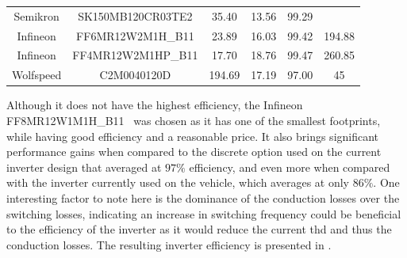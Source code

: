 \begin{table}[]
{\begin{tabular}{cccccc}
		Semikron              & SK150MB120CR03TE2          & 35.40         & 13.56  & 99.29      &                \\
		Infineon              & FF6MR12W2M1H\_B11          & 23.89         & 16.03  & 99.42      & 194.88         \\
		Infineon              & FF4MR12W2M1HP\_B11         & 17.70         & 18.76  & 99.47      & 260.85         \\ \midrule
		Wolfspeed             & C2M0040120D                & 194.69        & 17.19  & 97.00      & 45             \\ \bottomrule
	\end{tabular}
	}
\end{table}

Although it does not have the highest efficiency, the Infineon FF8MR12W1M1H\_B11~\cite{Infineon:Module_Datasheet:2023} was chosen as it has one of the smallest footprints, while having good efficiency and a reasonable price.  It also brings significant performance gains when compared to the discrete option used on the current inverter design that averaged at $97\%$ efficiency, and even more when compared with the inverter currently used on the vehicle, which averages at only $86\%$. One interesting factor to note here is the dominance of the conduction losses over the switching losses, indicating an increase in switching frequency could be beneficial to the efficiency of the inverter as it would reduce the current \gls{thd} and thus the conduction losses. The resulting inverter efficiency is presented in .


